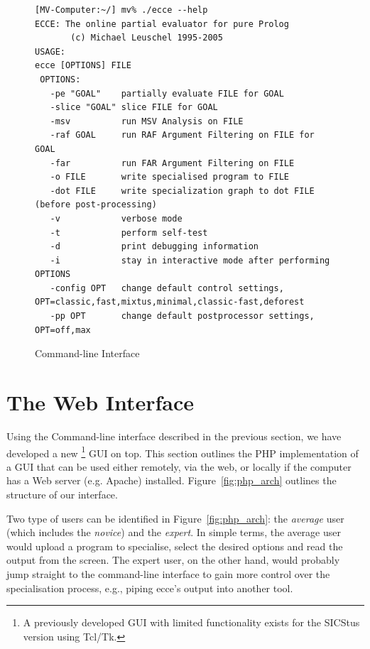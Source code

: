 \documentclass{sig-alternate}
\begin{document}
\begin{figure}[!ht]
\centering
\begin{minipage}[t]{.9\textwidth}
\begin{scriptsize}\begin{verbatim}
[MV-Computer:~/] mv% ./ecce --help
ECCE: The online partial evaluator for pure Prolog
       (c) Michael Leuschel 1995-2005
USAGE: 
ecce [OPTIONS] FILE
 OPTIONS:
   -pe "GOAL"    partially evaluate FILE for GOAL
   -slice "GOAL" slice FILE for GOAL
   -msv          run MSV Analysis on FILE
   -raf GOAL     run RAF Argument Filtering on FILE for GOAL
   -far          run FAR Argument Filtering on FILE
   -o FILE       write specialised program to FILE
   -dot FILE     write specialization graph to dot FILE (before post-processing)
   -v            verbose mode
   -t            perform self-test
   -d            print debugging information
   -i            stay in interactive mode after performing OPTIONS
   -config OPT   change default control settings, OPT=classic,fast,mixtus,minimal,classic-fast,deforest
   -pp OPT       change default postprocessor settings, OPT=off,max
\end{verbatim}\end{scriptsize}
\end{minipage}
\caption{Command-line Interface}\label{fig:CLI}
\end{figure} 


\section{The Web Interface}

Using the Command-line interface described in the previous section, we have developed a new%
\footnote{A previously developed GUI with limited functionality exists for the SICStus version using Tcl/Tk.} GUI on top.
This section outlines the PHP implementation of a GUI that can be used either remotely, via the web, or locally if the computer has a Web server (e.g. Apache) installed. Figure~\ref{fig:php_arch} outlines the structure of our interface.

Two type of users can be identified in Figure~\ref{fig:php_arch}: the {\em average} user (which includes the {\em novice}) and the {\em expert}. In simple terms, the average user would upload a program to specialise, select the desired options and read the output from the screen. The expert user, on the other hand, would probably jump straight to the command-line interface
 to gain more control over the specialisation process, e.g., piping {\sc ecce}'s output into another tool.
\end{document}
